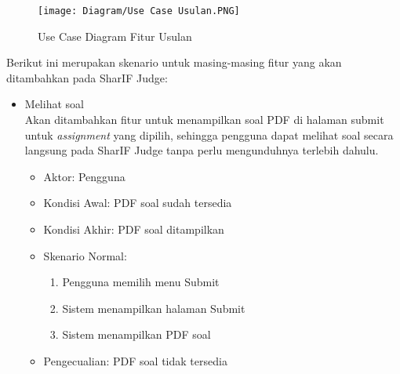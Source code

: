     \begin{figure}[H]
    	\centering  
    	\texttt{[image: Diagram/Use Case Usulan.PNG]}  
    	\caption{Use Case Diagram Fitur Usulan}
    	\label{fig:3:usecase} 
    \end{figure} 

\pagebreak
Berikut ini merupakan skenario untuk masing-masing fitur yang akan ditambahkan pada SharIF Judge:

\begin{itemize}

    \item Melihat soal \\ Akan ditambahkan fitur untuk menampilkan soal PDF di halaman submit untuk \textit{assignment} yang dipilih, sehingga pengguna dapat melihat soal secara langsung pada SharIF Judge tanpa perlu mengunduhnya terlebih dahulu.
        \begin{itemize}
            \item Aktor: Pengguna
            \item Kondisi Awal: PDF soal sudah tersedia
            \item Kondisi Akhir: PDF soal ditampilkan
            \item Skenario Normal:
                \begin{enumerate}
                    \item Pengguna memilih menu Submit
                    \item Sistem menampilkan halaman Submit
                    \item Sistem menampilkan PDF soal
                \end{enumerate}
            \item Pengecualian: PDF soal tidak tersedia
        \end{itemize}
        

\end{itemize}
